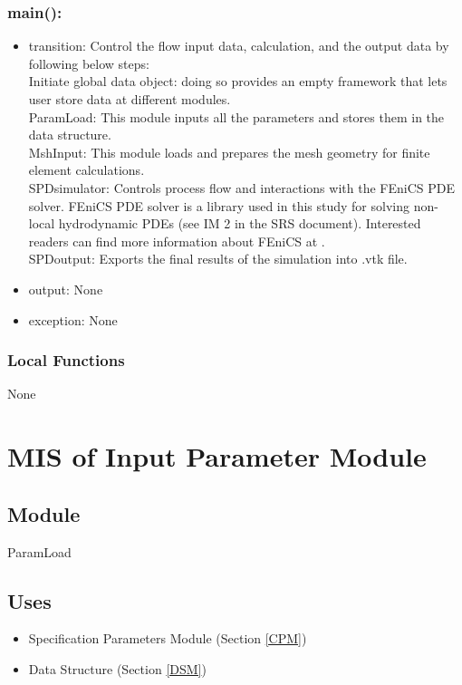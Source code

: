 \documentclass[12pt, titlepage]{article}
\begin{document}
	\subsubsection*{main():} \begin{itemize} \item transition: Control the flow
		input data, calculation, and the output data by following below steps:\\
		
		\subitem Initiate global data object: doing so provides an empty framework that
		lets user store data at different modules. \\ \subitem ParamLoad: This module
		inputs all the parameters and stores them in the data structure.\\
		
		\subitem MshInput: This module loads and prepares the mesh geometry for finite
		element calculations.\\
		
		\subitem SPDsimulator: Controls process flow and interactions with the FEniCS
		PDE solver. FEniCS PDE solver is a library used in this study for solving
		non-local hydrodynamic PDEs (see IM 2 in the SRS document). Interested readers
		can find more information about FEniCS at
		\cite{alnaes2015fenics,logg2012finite}.\\
		
		\subitem SPDoutput: Exports the final results of the simulation into .vtk file.
		
		\item output: None \item exception: None \end{itemize}
	
	
	\subsubsection{Local Functions}
	
	None
	
	\newpage %
	\section{MIS of Input Parameter Module} \label{IPM}
	
	\subsection{Module} ParamLoad
	
	\subsection{Uses} \begin{itemize} \item Specification Parameters Module (Section
		\ref{CPM}) \item Data Structure (Section \ref{DSM})
		
	\end{itemize}
	
\end{document}
